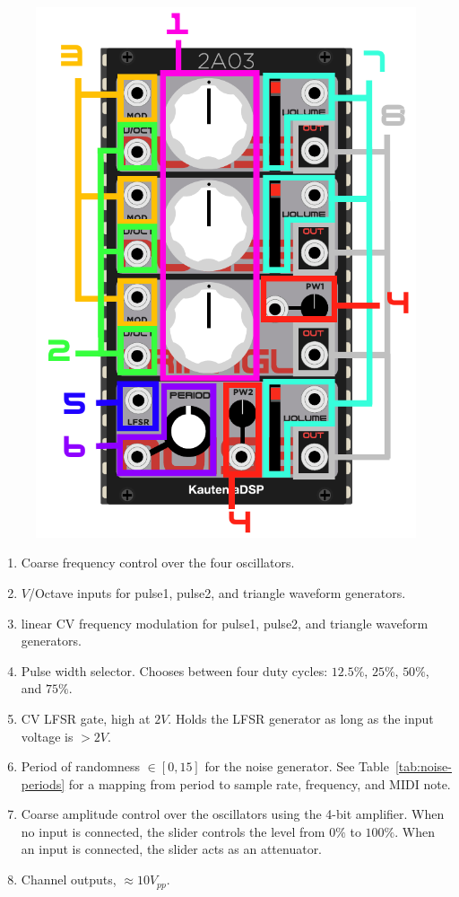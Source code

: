 \documentclass[12pt,a4paper]{article}
\begin{document}
\begin{figure}[!htp]
\centering
\includegraphics{2A03-Manual}
\end{figure}

\begin{enumerate}
  \item Coarse frequency control over the four oscillators.
  \item $V$/Octave inputs for pulse1, pulse2, and triangle waveform generators.
  \item linear CV frequency modulation for pulse1, pulse2, and triangle waveform generators.
  \item Pulse width selector. Chooses between four duty cycles: $12.5\%$, $25\%$, $50\%$, and $75\%$.
  \item CV LFSR gate, high at $2V$. Holds the LFSR generator as long as the input voltage is $>2V$.
  \item Period of randomness $\in [0, 15]$ for the noise generator. See Table~\ref{tab:noise-periods} for a mapping from period to sample rate, frequency, and MIDI note.
  \item Coarse amplitude control over the oscillators using the 4-bit amplifier. When no input is connected, the slider controls the level from $0\%$ to $100\%$. When an input is connected, the slider acts as an attenuator.
  \item Channel outputs, ${\approx}10V_{pp}$.
\end{enumerate}
\end{document}
